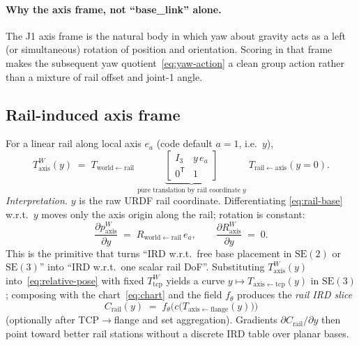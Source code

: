 \documentclass[11pt,a4paper]{article}
\newcommand{\SE}{\mathrm{SE}}
\newcommand{\Tcp}{T_{\mathrm{tcp}}}
\newcommand{\Taxis}{T_{\mathrm{axis}}}
\begin{document}
\paragraph{Why the axis frame, not ``base\_link'' alone.}
The J1 axis frame is the natural body in which yaw about gravity acts as a
left (or simultaneous) rotation of position and orientation. Scoring in that
frame makes the subsequent yaw quotient~\eqref{eq:yaw-action} a clean group
action rather than a mixture of rail offset and joint-1 angle.

\subsection{Rail-induced axis frame}
\label{sec:rail}

For a linear rail along local axis \(e_{a}\) (code default \(a=1\), i.e.\ \(y\)),
\begin{equation}
\label{eq:rail-base}
  \Taxis^{W}(y)
  \;=\;
  T_{\mathrm{world\leftarrow rail}}\;
  \underbrace{
    \begin{bmatrix}
      I_{3} & y\, e_{a} \\
      0^{\mathsf T} & 1
    \end{bmatrix}
  }_{\text{pure translation by rail coordinate }y}\;
  T_{\mathrm{rail\leftarrow axis}}(y{=}0).
\end{equation}
\emph{Interpretation.}
\(y\) is the raw URDF rail coordinate. Differentiating
\eqref{eq:rail-base} w.r.t.\ \(y\) moves only the axis origin along the rail;
rotation is constant:
\begin{equation}
\label{eq:rail-jacobian}
  \frac{\partial p_{\mathrm{axis}}^{W}}{\partial y}
  \;=\;
  R_{\mathrm{world\leftarrow rail}}\, e_{a},
  \qquad
  \frac{\partial R_{\mathrm{axis}}^{W}}{\partial y}
  \;=\;
  0.
\end{equation}
This is the primitive that turns ``IRD w.r.t.\ free base placement in
\(\SE(2)\) or \(\SE(3)\)'' into ``IRD w.r.t.\ one scalar rail DoF''.
Substituting \(\Taxis^{W}(y)\) into~\eqref{eq:relative-pose} with fixed
\(\Tcp^{W}\) yields a curve
\(y\mapsto T_{\mathrm{axis\leftarrow tcp}}(y)\) in \(\SE(3)\); composing with
the chart~\eqref{eq:chart} and the field \(f_{\theta}\) produces the
\emph{rail IRD slice}
\begin{equation}
\label{eq:rail-ird}
  C_{\mathrm{rail}}(y)
  \;=\;
  f_{\theta}\bigl(
    c\bigl(T_{\mathrm{axis\leftarrow flange}}(y)\bigr)
  \bigr)
\end{equation}
(optionally after TCP\(\to\)flange and set aggregation). Gradients
\(\partial C_{\mathrm{rail}}/\partial y\) then point toward better rail
stations without a discrete IRD table over planar bases.
\end{document}
